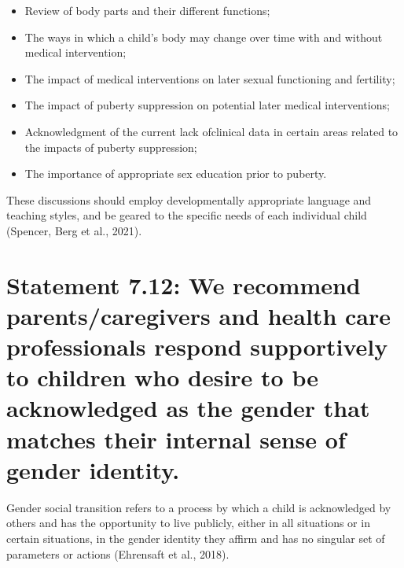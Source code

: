 \documentclass[
]{book}
\providecommand{\tightlist}{%
  \setlength{\itemsep}{0pt}\setlength{\parskip}{0pt}}
\begin{document}
\begin{itemize}
\tightlist
\item
  Review of body parts and their different functions;
\item
  The ways in which a child's body may change over time with and without medical intervention;
\item
  The impact of medical interventions on later sexual functioning and fertility;
\item
  The impact of puberty suppression on potential later medical interventions;
\item
  Acknowledgment of the current lack ofclinical data in certain areas related to the impacts of puberty suppression;
\item
  The importance of appropriate sex education prior to puberty.
\end{itemize}

These discussions should employ developmentally appropriate language and teaching styles,
and be geared to the specific needs of each individual child (Spencer, Berg et al., 2021).

\hypertarget{statement-7.12-we-recommend-parentscaregivers-and-health-care-professionals-respond-supportively-to-children-who-desire-to-be-acknowledged-as-the-gender-that-matches-their-internal-sense-of-gender-identity.}{%
\section*{Statement 7.12: We recommend parents/caregivers and health care professionals respond supportively to children who desire to be acknowledged as the gender that matches their internal sense of gender identity.}\label{statement-7.12-we-recommend-parentscaregivers-and-health-care-professionals-respond-supportively-to-children-who-desire-to-be-acknowledged-as-the-gender-that-matches-their-internal-sense-of-gender-identity.}}

Gender social transition refers to a process by
which a child is acknowledged by others and has
the opportunity to live publicly, either in all situations or in certain situations, in the gender
identity they affirm and has no singular set of
parameters or actions (Ehrensaft et al., 2018).
\end{document}
